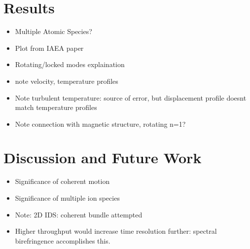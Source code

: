 \documentclass[10pt]{article}
\begin{document}
\section{Results}
\begin{itemize}
	\item Multiple Atomic Species?
	\item Plot from IAEA paper
	\item Rotating/locked modes explaination
	\item note velocity, temperature profiles
	\item Note turbulent temperature: source of error, but displacement profile doesnt match temperature profiles
	\item Note connection with magnetic structure, rotating n=1?
\end{itemize}
\section{Discussion and Future Work}
\begin{itemize}
	\item Significance of coherent motion
	\item Significance of multiple ion species
	\item Note: 2D IDS: coherent bundle attempted
	\item Higher throughput would increase time resolution further: spectral birefringence accomplishes this.
\end{itemize}
	
	
	
	
	
\end{document}
